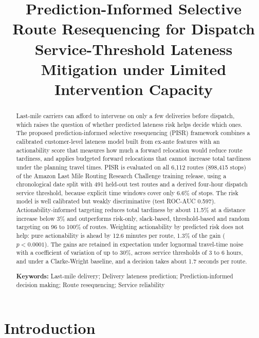 \documentclass[11pt,a4paper]{article}
\title{\textbf{Prediction-Informed Selective Route Resequencing for Dispatch Service-Threshold Lateness Mitigation under Limited Intervention Capacity}}
\author{}
\date{}
\begin{document}
\maketitle

\begin{abstract}
\noindent
Last-mile carriers can afford to intervene on only a few deliveries before dispatch, which raises the question of whether predicted lateness risk helps decide which ones. The proposed prediction-informed selective resequencing (PISR) framework combines a calibrated customer-level lateness model built from ex-ante features with an actionability score that measures how much a forward relocation would reduce route tardiness, and applies budgeted forward relocations that cannot increase total tardiness under the planning travel times. PISR is evaluated on all 6,112 routes (898,415 stops) of the Amazon Last Mile Routing Research Challenge training release, using a chronological date split with 491 held-out test routes and a derived four-hour dispatch service threshold, because explicit time windows cover only 6.6\% of stops. The risk model is well calibrated but weakly discriminative (test ROC-AUC 0.597). Actionability-informed targeting reduces total tardiness by about 11.5\% at a distance increase below 3\% and outperforms risk-only, slack-based, threshold-based and random targeting on 96 to 100\% of routes. Weighting actionability by predicted risk does not help: pure actionability is ahead by 12.6 minutes per route, 1.3\% of the gain ($p < 0.0001$). The gains are retained in expectation under lognormal travel-time noise with a coefficient of variation of up to 30\%, across service thresholds of 3 to 6 hours, and under a Clarke-Wright baseline, and a decision takes about 1.7 seconds per route.

\medskip
\noindent
\textbf{Keywords:} Last-mile delivery; Delivery lateness prediction; Prediction-informed decision making; Route resequencing; Service reliability
\end{abstract}

\section{Introduction}\label{sec:introduction}
\end{document}
